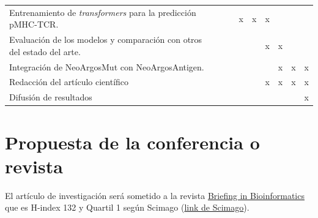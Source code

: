 \documentclass[a4paper,11pt]{article}
\begin{document}
\begin{table}[H]
{{\begin{tabular}{|p{10cm}|l|c|c|c|c|c|c|c|c|}
		Entrenamiento de  \textit{transformers} para la predicción pMHC-TCR.  &                                      &                       &                        &             x            &    x                    & x                     & &                       &                                               \\
		Evaluación de los modelos y comparación con otros del estado del arte.  &                                      &                       &                        &                         &                        & x                     & x &                       &                                               \\
		Integración de NeoArgosMut con NeoArgosAntigen.  &                                      &                       &                        &                         &                        &                     & x &         x              &   x                                           \\

            Redacción del artículo científico &                                      &                       &                        &                         &                        & x                     & x & x                      & x                                              \\
            
		Difusión de resultados    &                              &                       &                        &                         &                       &                      &                       & & x                                             \\ \hline
	\end{tabular}
 }
}
\end{table}

\clearpage

\section{Propuesta de la conferencia o revista}

El artículo de investigación será sometido  a la revista  \href{https://academic.oup.com/bib?campaignid=20617591354&adgroupid=&adid=&gclid=Cj0KCQjwsp6pBhCfARIsAD3GZuar7JO7kkA0brznfmZRDJJH5NDhGjJsyhTv859p33ddEqtW1Z5JkfQaAvEZEALw_wcB}{ Briefing in Bioinformatics} que es H-index 132 y Quartil 1 según Scimago (\href{https://www.scimagojr.com/journalsearch.php?q=17956&tip=sid&clean=0}{link de Scimago}). 
\end{document}
